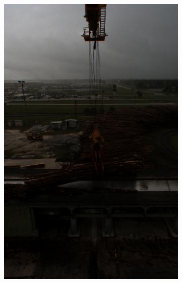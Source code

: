 \begin{figure}[h]
\begin{subfigure}[c]{0.24\textwidth}
			\includegraphics[width=1\textwidth]{bilder/Grundlagen/Daten_Bildqualitaet/dunkel.png}
		\end{subfigure}
		\begin{subfigure}[c]{0.24\textwidth}			

\end{subfigure}
\end{figure}
